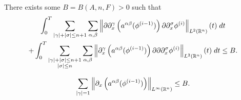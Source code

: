 \documentclass{article}
\begin{document}
\begin{lemma} There exists some $B = B(A, n, F) > 0$ such that 
\begin{multline*}
	\int_{0}^{T}\sum_{|\gamma| + |\sigma| \leq n + 1}\sum_{\alpha,\beta}\left\Vert \partial\partial^{\gamma}_{x}\left(a^{\alpha\beta}(\phi^{(i - 1)})\right)\partial\partial_{x}^{\sigma}\phi^{(i)} \right\Vert_{L^{2}(\mathbb{R}^{n})}(t)\;dt \\ 
	+ \int_{0}^{T}\sum_{\substack{|\gamma| + |\sigma| \leq n + 1 \\ |\sigma|\leq n}}\sum_{\alpha,\beta}\left\Vert  \partial_{x}^{\gamma}\left(a^{\alpha\beta}(\phi^{(i - 1)})\right)\partial\partial\partial^{\sigma}_{x}\phi^{(i)}  \right\Vert_{L^{2}(\mathbb{R}^{n})}(t)\;dt \leq B.
	\end{multline*}
\end{lemma} 
\begin{lemma}
	\begin{equation*}
		\sum_{|\gamma| = 1}\left\Vert \partial_{x}\left(a^{\alpha\beta}(\phi^{(i - 1)})\right) \right\Vert_{L^{\infty}(\mathbb{R}^{n})} \leq B. 
	\end{equation*}  
\end{lemma} 
\end{document}
